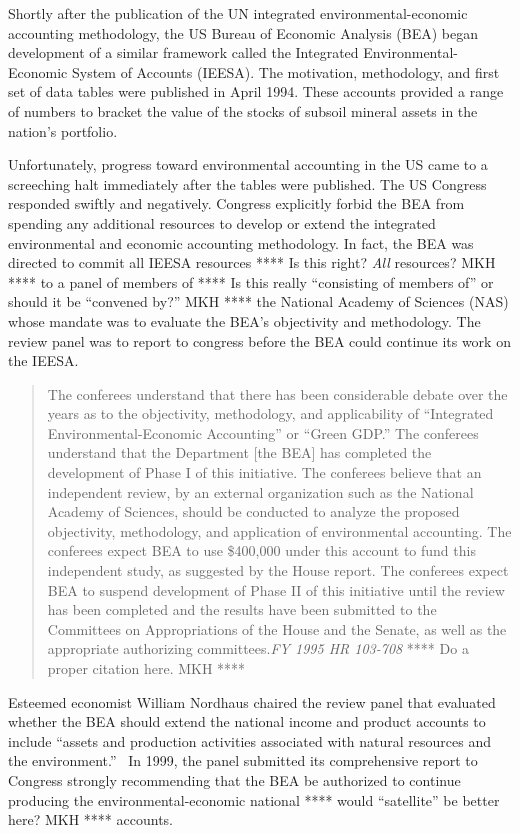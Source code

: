 Shortly after the publication 
of the UN integrated environmental-economic accounting methodology, 
the US Bureau of Economic Analysis (BEA) began development of a similar
framework called the 
Integrated Environmental-Economic System of Accounts (IEESA). 
The motivation, methodology, and first set of data tables were published 
in April 1994.\cite{BEA1994a} 
These accounts provided a range of numbers to bracket the value
of the stocks of subsoil mineral assets in the nation's portfolio. 

Unfortunately, progress toward environmental accounting 
in the US came to a screeching halt immediately after the tables were published. 
The US Congress responded swiftly and negatively. 
Congress explicitly forbid the BEA from spending  
any additional resources to develop or extend
the integrated environmental and economic accounting methodology. 
In fact, the BEA was directed 
to commit all IEESA resources 
**** Is this right? \emph{All} resources? MKH ****
to a panel 
of members of
**** Is this really ``consisting of members of'' or should it be 
``convened by?'' MKH ****
the National Academy of Sciences (NAS)
whose mandate was to evaluate the BEA’s objectivity and methodology.
The review panel was to report to congress before the BEA 
could continue its work on the IEESA.

\begin{quote}
	The conferees understand that there has been considerable debate 
	over the years as to the objectivity, methodology, and applicability 
	of ``Integrated Environmental-Economic Accounting'' or ``Green GDP.''
	The conferees understand that the Department [the BEA]
	has completed the development of Phase I of this initiative. 
	The conferees believe that an independent review, 
	by an external organization such as the National Academy of Sciences, 
	should be conducted to analyze 
	the proposed objectivity, methodology, and application of environmental accounting. 
	The conferees expect BEA to use \$400,000 under this account 
	to fund this independent study, as suggested by the House report. 
	The conferees expect BEA to suspend development 
	of Phase II of this initiative 
	until the review has been completed and the results have been submitted 
	to the Committees on Appropriations of the House and the Senate, 
	as well as the appropriate authorizing committees.\emph{FY 1995 HR 103-708}
	**** Do a proper citation here. MKH ****
\end{quote}

Esteemed economist William Nordhaus chaired the review panel
that evaluated whether the BEA should extend 
the national income and product accounts to include 
``assets and production activities associated 
with natural resources and the environment.''~\cite[p.~2]{Nordhaus1999a} 
In 1999, the panel submitted its comprehensive report 
to Congress strongly recommending that the BEA be authorized 
to continue producing the environmental-economic national
**** would ``satellite'' be better here? MKH **** accounts.\cite{Nordhaus1999a}

